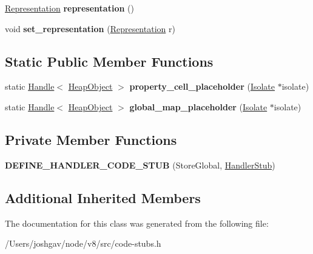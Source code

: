 \begin{DoxyCompactItemize}
\item 
\hyperlink{classv8_1_1internal_1_1_representation}{Representation} {\bfseries representation} ()\hypertarget{classv8_1_1internal_1_1_store_global_stub_a28c5eefaf6ec35d168624935746876c6}{}\label{classv8_1_1internal_1_1_store_global_stub_a28c5eefaf6ec35d168624935746876c6}

\item 
void {\bfseries set\+\_\+representation} (\hyperlink{classv8_1_1internal_1_1_representation}{Representation} r)\hypertarget{classv8_1_1internal_1_1_store_global_stub_aaa20114121d0cf8769a6ed37c90326fc}{}\label{classv8_1_1internal_1_1_store_global_stub_aaa20114121d0cf8769a6ed37c90326fc}

\end{DoxyCompactItemize}
\subsection*{Static Public Member Functions}
\begin{DoxyCompactItemize}
\item 
static \hyperlink{classv8_1_1internal_1_1_handle}{Handle}$<$ \hyperlink{classv8_1_1internal_1_1_heap_object}{Heap\+Object} $>$ {\bfseries property\+\_\+cell\+\_\+placeholder} (\hyperlink{classv8_1_1internal_1_1_isolate}{Isolate} $\ast$isolate)\hypertarget{classv8_1_1internal_1_1_store_global_stub_ab15eb1eb3a1879a4c6bb2d51ff36bcd0}{}\label{classv8_1_1internal_1_1_store_global_stub_ab15eb1eb3a1879a4c6bb2d51ff36bcd0}

\item 
static \hyperlink{classv8_1_1internal_1_1_handle}{Handle}$<$ \hyperlink{classv8_1_1internal_1_1_heap_object}{Heap\+Object} $>$ {\bfseries global\+\_\+map\+\_\+placeholder} (\hyperlink{classv8_1_1internal_1_1_isolate}{Isolate} $\ast$isolate)\hypertarget{classv8_1_1internal_1_1_store_global_stub_ac824232a2c3afc2e607f985697ed274c}{}\label{classv8_1_1internal_1_1_store_global_stub_ac824232a2c3afc2e607f985697ed274c}

\end{DoxyCompactItemize}
\subsection*{Private Member Functions}
\begin{DoxyCompactItemize}
\item 
{\bfseries D\+E\+F\+I\+N\+E\+\_\+\+H\+A\+N\+D\+L\+E\+R\+\_\+\+C\+O\+D\+E\+\_\+\+S\+T\+UB} (Store\+Global, \hyperlink{classv8_1_1internal_1_1_handler_stub}{Handler\+Stub})\hypertarget{classv8_1_1internal_1_1_store_global_stub_af2112229fc55ffbead467cc521fae535}{}\label{classv8_1_1internal_1_1_store_global_stub_af2112229fc55ffbead467cc521fae535}

\end{DoxyCompactItemize}
\subsection*{Additional Inherited Members}


The documentation for this class was generated from the following file\+:\begin{DoxyCompactItemize}
\item 
/\+Users/joshgav/node/v8/src/code-\/stubs.\+h\end{DoxyCompactItemize}
